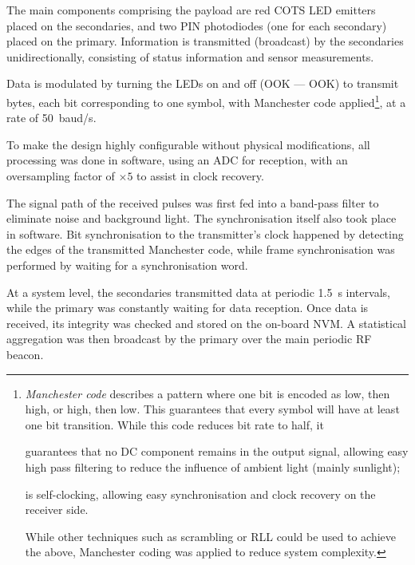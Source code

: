 \documentclass[a4paper,nobib,justified,final]{tufte-book}
\begin{document}
The main components comprising the payload are red \acs{COTS} \ac{LED} emitters placed on the secondaries, and two \acs{PIN} photodiodes (one for each secondary) placed on the primary. Information is transmitted (broadcast) by the secondaries unidirectionally, consisting of status information and sensor measurements.

Data is modulated by turning the \acsp{LED} on and off (\acs{OOK} --- \acl{OOK}) to transmit bytes, each bit corresponding to one symbol, with Manchester code applied\footnote[][-2.5cm]{\emph{Manchester code} describes a pattern where one bit is encoded as low, then high, or high, then low. This guarantees that every symbol will have at least one bit transition. While this code reduces bit rate to half, it \begin{enumerate*}
		\item guarantees that no \ac{DC} component remains in the output signal, allowing easy high pass filtering to reduce the influence of ambient light (mainly sunlight);
		\item is self-clocking, allowing easy synchronisation and clock recovery on the receiver side.
	\end{enumerate*} While other techniques such as scrambling or \ac{RLL} could be used to achieve the above, Manchester coding was applied to reduce system complexity. }, at a rate of \SI{50}{baud/\second}.

To make the design highly configurable without physical modifications, all processing was done in software, using an \acs{ADC} for reception, with an oversampling factor of \( \times 5 \) to assist in clock recovery.

The signal path of the received pulses was first fed into a band-pass filter to eliminate noise and background light.
The synchronisation itself also took place in software. Bit synchronisation to the transmitter's clock happened by detecting the edges of the transmitted Manchester code, while frame synchronisation was performed by waiting for a synchronisation word.

At a system level, the secondaries transmitted data at periodic \qty{1.5}{\second} intervals, while the primary was constantly waiting for data reception.
Once data is received, its integrity was checked and stored on the on-board \ac{NVM}. A statistical aggregation was then broadcast by the primary over the main periodic \acs{RF} beacon.
\end{document}
